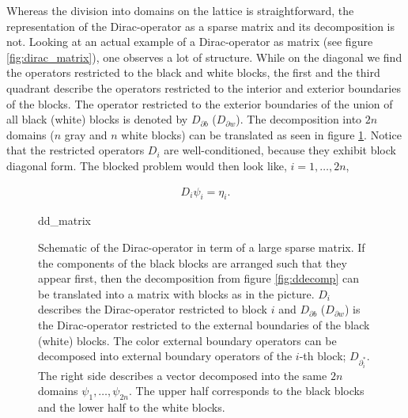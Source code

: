 \documentclass{article}
\theoremstyle{plain} %
\theoremstyle{convention} %
\theoremstyle{remark} %
\numberwithin{equation}{section}
\begin{document}
Whereas the division into domains on the lattice is straightforward, the representation of the Dirac-operator as a sparse matrix and its decomposition is not. Looking at an actual example of a Dirac-operator as matrix (see figure \ref{fig:dirac_matrix}), one observes a lot of structure. While on the diagonal we find the operators restricted to the black and white blocks, the first and the third quadrant describe the operators restricted to the interior and exterior boundaries of the blocks. The operator restricted to the exterior boundaries of the union of all black (white) blocks is denoted by $D_{\partial b}$ ($D_{\partial w}$). The decomposition into $2n$ domains ($n$ gray and $n$ white blocks) can be translated as seen in figure \ref{fig:ddecomp_matrix}. Notice that the restricted operators $D_i$ are well-conditioned, because they exhibit block diagonal form. The blocked problem would then look like, $i = 1, \dots, 2n$,

\begin{align*}
    D_i \psi_i = \eta_i.
\end{align*}

\begin{figure}[h]
  \centering
  {dd_matrix}
  \caption{Schematic of the Dirac-operator in term of a large sparse matrix. If the components of the black blocks are arranged such that they appear first, then the decomposition from figure \ref{fig:ddecomp} can be translated into a matrix with blocks as in the picture. $D_i$ describes the Dirac-operator restricted to block $i$ and $D_{\partial b}$ ($D_{\partial w}$) is the Dirac-operator restricted to the external boundaries of the black (white) blocks. The color external boundary operators can be decomposed into external boundary operators of the $i$-th block; $D_{\partial^{*}_i}$. The right side describes a vector decomposed into the same $2n$ domains $\psi_1, \dots, \psi_{2n}$. The upper half corresponds to the black blocks and the lower half to the white blocks.}
  \label{fig:ddecomp_matrix}
\end{figure}

\end{document}
